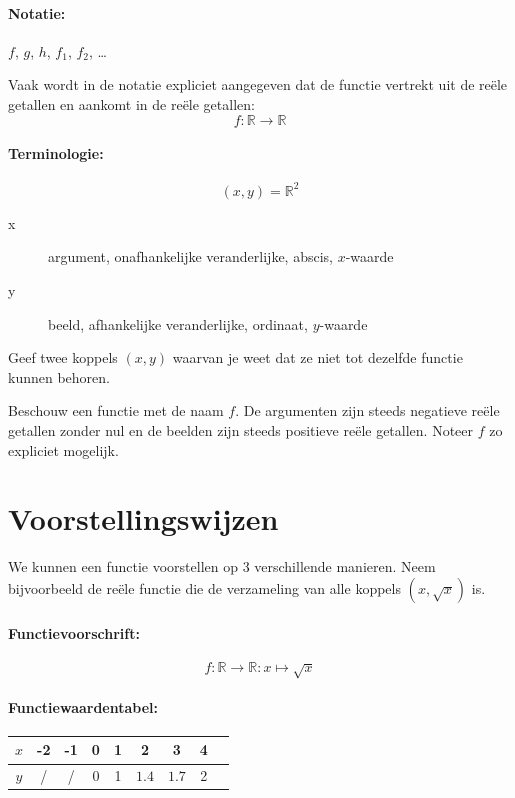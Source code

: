 \documentclass[12pt,twoside]{article}
\begin{document}
\paragraph{Notatie:} $f$, $g$, $h$, $f_1$, $f_2$, \ldots

Vaak wordt in de notatie expliciet aangegeven dat de functie vertrekt uit de reële getallen en aankomt in de reële getallen:
$$f:\mathbb{R}\to\mathbb{R}$$

\paragraph{Terminologie:}
$$(x,y) = \mathbb{R}^2$$
\begin{description}
  \item[x] argument, onafhankelijke veranderlijke, abscis, $x$-waarde
  \item[y] beeld, afhankelijke veranderlijke, ordinaat, $y$-waarde
\end{description}

\begin{oefening}
Geef twee koppels $(x,y)$ waarvan je weet dat ze niet tot dezelfde functie kunnen behoren.
\end{oefening}

\begin{oefening}
Beschouw een functie met de naam $f$. De argumenten zijn steeds negatieve reële getallen zonder nul en de beelden zijn steeds positieve reële getallen. Noteer $f$ zo expliciet mogelijk.
\end{oefening}

\pagebreak
\section{Voorstellingswijzen}
We kunnen een functie voorstellen op 3 verschillende manieren. Neem bijvoorbeeld de reële functie die de verzameling van alle koppels $(x,\sqrt{x})$ is.

\paragraph{Functievoorschrift:}
$$f:\mathbb{R}\to\mathbb{R}:x\mapsto\sqrt{x}$$

\paragraph{Functiewaardentabel:}
\begin{center}
\begin{tabular}{c|cccccccc}
  $x$ & -2 & -1 & 0 & 1 & 2 & 3 & 4\\
  \hline
  $y$ & / & / & 0 & 1 & $1.4$ & $1.7$ & 2\\
\end{tabular}
\end{center}
\end{document}
